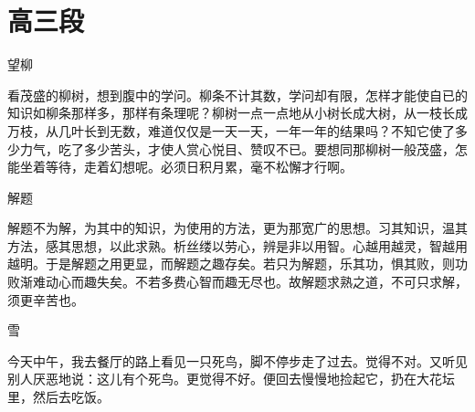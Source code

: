 \documentclass{article}
\begin{document}
\renewcommand\title[1]{\par\vspace*{2ex}\centerline{\large#1}\par}
\renewcommand\date[1]{\par\hfill#1}
\section{高三段}
\title{望柳}
看茂盛的柳树，想到腹中的学问。柳条不计其数，学问却有限，怎样才能使自已的知识如柳条那样多，那样有条理呢？柳树一点一点地从小树长成大树，从一枝长成万枝，从几叶长到无数，难道仅仅是一天一天，一年一年的结果吗？不知它使了多少力气，吃了多少苦头，才使人赏心悦目、赞叹不已。要想同那柳树一般茂盛，怎能坐着等待，走着幻想呢。必须日积月累，毫不松懈才行啊。
\title{解题}
解题不为解，为其中的知识，为使用的方法，更为那宽广的思想。习其知识，温其方法，感其思想，以此求熟。析丝缕以劳心，辨是非以用智。心越用越灵，智越用越明。于是解题之用更显，而解题之趣存矣。若只为解题，乐其功，惧其败，则功败渐难动心而趣失矣。不若多费心智而趣无尽也。故解题求熟之道，不可只求解，须更辛苦也。
\title{雪}
今天中午，我去餐厅的路上看见一只死鸟，脚不停步走了过去。觉得不对。又听见别人厌恶地说：这儿有个死鸟。更觉得不好。便回去慢慢地捡起它，扔在大花坛里，然后去吃饭。
\end{document}
